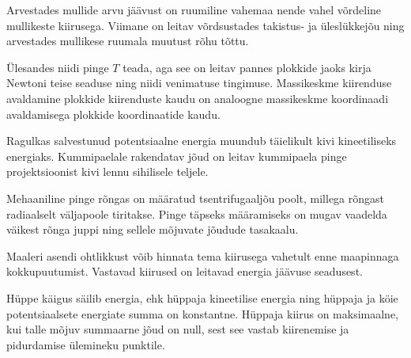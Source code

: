 \documentclass[10pt]{article}
\begin{document}
{
\hint
Arvestades mullide arvu jäävust on ruumiline vahemaa nende vahel võrdeline mullikeste kiirusega. Viimane on leitav võrdsustades takistus- ja üleslükkejõu ning arvestades mullikese ruumala muutust rõhu tõttu.
\probend
\bigskip


\hint
Ülesandes niidi pinge $T$ teada, aga see on leitav pannes plokkide jaoks kirja Newtoni teise seaduse ning niidi venimatuse tingimuse. Massikeskme kiirenduse avaldamine plokkide kiirenduste kaudu on analoogne massikeskme koordinaadi avaldamisega plokkide koordinaatide kaudu.
\probend
\bigskip


\hint
Ragulkas salvestunud potentsiaalne energia muundub täielikult kivi kineetiliseks energiaks. Kummipaelale rakendatav jõud on leitav kummipaela pinge projektsioonist kivi lennu sihilisele teljele.
\probend
\bigskip


\hint
Mehaaniline pinge rõngas on määratud tsentrifugaaljõu poolt, millega rõngast radiaalselt väljapoole tiritakse. Pinge täpseks määramiseks on mugav vaadelda väikest rõnga juppi ning sellele mõjuvate jõudude tasakaalu.
\probend
\bigskip


\hint
Maaleri asendi ohtlikkust võib hinnata tema kiirusega vahetult enne maapinnaga kokkupuutumist. Vastavad kiirused on leitavad energia jäävuse seadusest.
\probend
\bigskip


\hint
Hüppe käigus säilib energia, ehk hüppaja kineetilise energia ning hüppaja ja köie potentsiaalsete energiate summa on konstantne. Hüppaja kiirus on maksimaalne, kui talle mõjuv summaarne jõud on null, sest see vastab kiirenemise ja pidurdamise ülemineku punktile.
\probend
\bigskip

}
\end{document}
